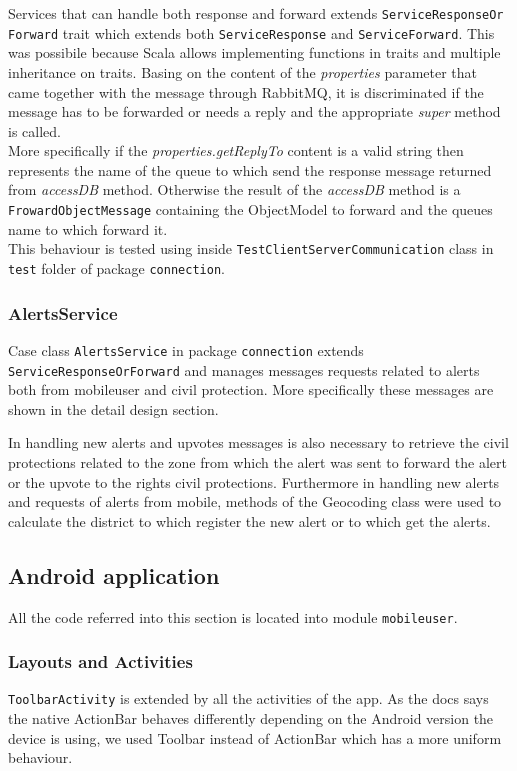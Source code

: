 \documentclass[a4paper,12pt]{report}
\begin{document}
Services that can handle both response and forward extends \texttt{ServiceResponseOr\\Forward} trait which extends both \texttt{ServiceResponse} and \texttt{ServiceForward}. This was possibile because Scala allows implementing functions in traits and multiple inheritance on traits. Basing on the content of the \textit{properties} parameter that came together with the message through RabbitMQ, it is discriminated if the message has to be forwarded or needs a reply and the appropriate \textit{super} method is called.
\\More specifically if the \textit{properties.getReplyTo} content is a valid string then represents the name of the queue to which send the response message returned from \textit{accessDB} method. Otherwise the result of the \textit{accessDB} method is a \texttt{FrowardObjectMessage} containing the ObjectModel to forward and the queues name to which forward it.
\\This behaviour is tested using inside \texttt{TestClientServerCommunication} class in \texttt{test} folder of package \texttt{connection}.
\\

\subsubsection{AlertsService}
Case class \texttt{AlertsService} in package \texttt{connection} extends \texttt{ServiceResponseOrForward} and manages messages requests related to alerts both from mobileuser and civil protection. More specifically these messages are shown in the detail design section.

In handling new alerts and upvotes messages is also necessary to retrieve the civil protections related to the zone from which the alert was sent to forward the alert or the upvote to the rights civil protections. Furthermore in handling new alerts and requests of alerts from mobile, methods of the Geocoding class were used to calculate the district to which register the new alert or to which get the alerts.

\subsection{Android application}

All the code referred into this section is located into module \texttt{mobileuser}.

\subsubsection{Layouts and Activities}
\texttt{ToolbarActivity} is extended by all the activities of the app. As the docs says the native ActionBar behaves differently depending on the Android version the device is using, we used Toolbar instead of ActionBar which has a more uniform behaviour.
\end{document}
